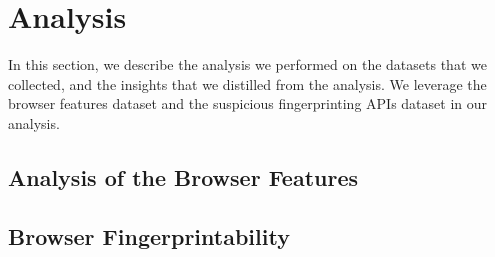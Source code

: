 \section{Analysis}
\label{sec:analysis}

In this section, we describe the analysis we performed on the datasets
that we collected, and the insights that we distilled from the
analysis. We leverage the browser features dataset and the suspicious fingerprinting APIs dataset in our analysis.

\subsection{Analysis of the Browser Features}



\subsection{Browser Fingerprintability}



% 
